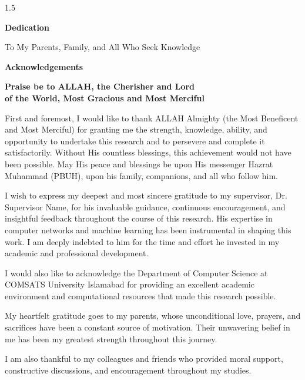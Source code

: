 \documentclass[A4paper,12pt]{report}
\theoremstyle{plain}
\theoremstyle{definition}
\theoremstyle{remark}
\numberwithin{equation}{section}
\begin{document}
\begin{spacing}{1.5}
\newpage
\begin{center}
\textbf{\LARGE{Dedication}}\\

\vspace{.5in}

\Large{To My Parents, Family, and All Who Seek Knowledge}


\end{center}


\newpage
\begin{center}
\LARGE\textbf{{Acknowledgements}}\\
\end{center}
\vspace{0.3in}
\begin{center}
\textbf{Praise be to ALLAH, the Cherisher and Lord\\of the World, Most Gracious and Most Merciful}
\end{center}
\normalsize{First and foremost, I would like to thank ALLAH Almighty (the Most Beneficent and Most Merciful) for granting me the strength, knowledge, ability, and opportunity to undertake this research and to persevere and complete it satisfactorily. Without His countless blessings, this achievement would not have been possible. May His peace and blessings be upon His messenger Hazrat Muhammad (PBUH), upon his family, companions, and all who follow him.

I wish to express my deepest and most sincere gratitude to my supervisor, Dr. Supervisor Name, for his invaluable guidance, continuous encouragement, and insightful feedback throughout the course of this research. His expertise in computer networks and machine learning has been instrumental in shaping this work. I am deeply indebted to him for the time and effort he invested in my academic and professional development.

I would also like to acknowledge the Department of Computer Science at COMSATS University Islamabad for providing an excellent academic environment and computational resources that made this research possible.

My heartfelt gratitude goes to my parents, whose unconditional love, prayers, and sacrifices have been a constant source of motivation. Their unwavering belief in me has been my greatest strength throughout this journey.

I am also thankful to my colleagues and friends who provided moral support, constructive discussions, and encouragement throughout my studies.

}
\end{spacing}
\end{document}
